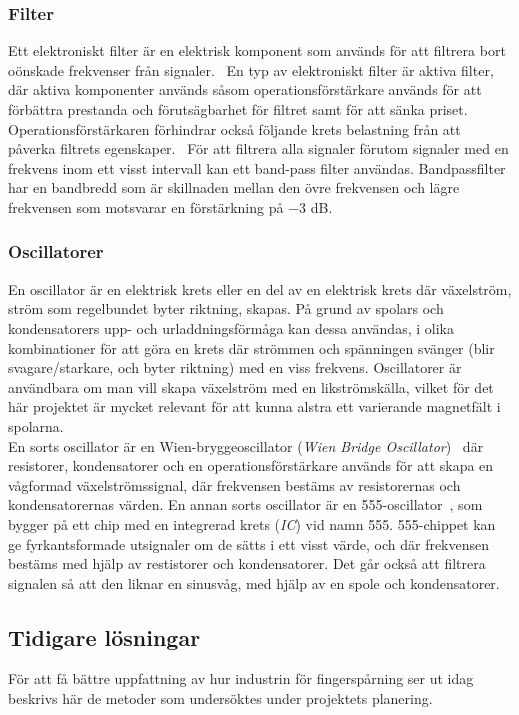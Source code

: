 \documentclass[a4paper]{article}
\begin{document}
\begin{sloppypar}
  \subsubsection{Filter}
  Ett elektroniskt filter är en elektrisk komponent som används för att filtrera bort oönskade frekvenser från signaler.~\cite{wiki:Electronic-filter}
  En typ av elektroniskt filter är aktiva filter, där aktiva komponenter används såsom operationsförstärkare används för att förbättra prestanda och förutsägbarhet för filtret samt för att sänka priset.
  Operationsförstärkaren förhindrar också följande krets belastning från att påverka filtrets egenskaper.~\cite{wiki:Active-filter}
  För att filtrera alla signaler förutom signaler med en frekvens inom ett visst intervall kan ett band-pass filter användas.
  Bandpassfilter har en bandbredd som är skillnaden mellan den övre frekvensen och lägre frekvensen som motsvarar en förstärkning på $-3$ dB.~\cite{wiki:Band-pass-filter}

  \subsubsection{Oscillatorer}
  En oscillator är en elektrisk krets eller en del av en elektrisk krets där växelström, ström som regelbundet byter riktning, skapas.
  På grund av spolars och kondensatorers upp- och urladdningsförmåga kan dessa användas, i olika kombinationer för att göra en krets där strömmen och spänningen svänger (blir svagare/starkare, och byter riktning) med en viss frekvens.
  Oscillatorer är användbara om man vill skapa växelström med en likströmskälla, vilket för det här projektet är mycket relevant för att kunna alstra ett varierande magnetfält i spolarna.
  \\
  En sorts oscillator är en Wien-bryggeoscillator (\textit{Wien Bridge Oscillator})~\cite{WienBridge} där resistorer, kondensatorer och en operationsförstärkare används för att skapa en vågformad växelströmssignal, där frekvensen bestäms av resistorernas och kondensatorernas värden.
  En annan sorts oscillator är en 555-oscillator~\cite{555_sine}, som bygger på ett chip med en integrerad krets (\textit{IC}) vid namn 555. 555-chippet kan ge fyrkantsformade utsignaler om de sätts i ett visst värde, och där frekvensen bestäms med hjälp av restistorer och kondensatorer. Det går också att filtrera signalen så att den liknar en sinusvåg, med hjälp av en spole och kondensatorer.

  \subsection{Tidigare lösningar}
  För att få bättre uppfattning av hur industrin för fingerspårning ser ut idag beskrivs här de metoder som undersöktes under projektets planering.


\end{sloppypar}
\end{document}
